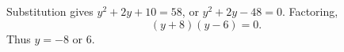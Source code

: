 Substitution gives $y^2+2y+10=58$, or $y^2+2y-48=0$. Factoring,
\[
(y+8)(y-6)=0.
\]
Thus $\boxed{y=-8\text{ or }6}$.
